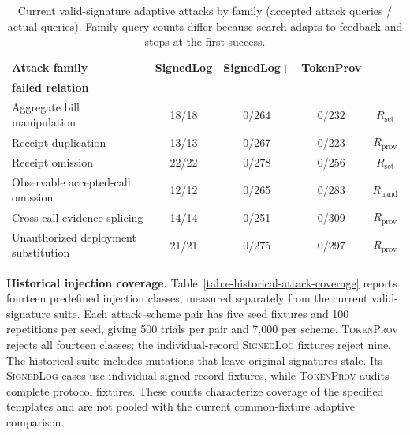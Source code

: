 \begin{table}[!t]
\centering
\caption{Current valid-signature adaptive attacks by family (accepted attack queries / actual queries). Family query counts differ because search adapts to feedback and stops at the first success.}
\label{tab:e-attack-families}
\footnotesize
\renewcommand{\arraystretch}{1.10}
\begin{tabular*}{\textwidth}{@{\hspace{4pt}}l@{\extracolsep{\fill}}cccc@{\hspace{4pt}}}
\toprule
\textbf{Attack family} & \textbf{SignedLog} & \textbf{SignedLog+} & \textbf{TokenProv} & \shortstack{\textbf{TokenProv first}\\\textbf{failed relation}} \\
\midrule
Aggregate bill manipulation & 18/18 & 0/264 & 0/232 & $R_{\mathrm{set}}$ \\
Receipt duplication & 13/13 & 0/267 & 0/223 & $R_{\mathrm{prov}}$ \\
Receipt omission & 22/22 & 0/278 & 0/256 & $R_{\mathrm{set}}$ \\
Observable accepted-call omission & 12/12 & 0/265 & 0/283 & $R_{\mathrm{hand}}$ \\
Cross-call evidence splicing & 14/14 & 0/251 & 0/309 & $R_{\mathrm{prov}}$ \\
Unauthorized deployment substitution & 21/21 & 0/275 & 0/297 & $R_{\mathrm{prov}}$ \\
\bottomrule
\end{tabular*}
\end{table}


\noindent\textbf{Historical injection coverage.}
Table~\ref{tab:e-historical-attack-coverage} reports fourteen predefined
injection classes, measured separately from the current valid-signature suite.
Each attack--scheme pair has five seed fixtures and 100 repetitions per seed,
giving 500 trials per pair and 7,000 per scheme.
\textsc{TokenProv} rejects all fourteen classes; the individual-record
\textsc{SignedLog} fixtures reject nine.
The historical suite includes mutations that leave original signatures stale.
Its \textsc{SignedLog} cases use individual signed-record fixtures, while
\textsc{TokenProv} audits complete protocol fixtures.
These counts characterize coverage of the specified templates and are not
pooled with the current common-fixture adaptive comparison.

